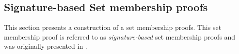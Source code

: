 





\subsection*{Signature-based  Set membership proofs}

This section presents a construction of a set membership proofs. This set membership proof is referred to as \textit{signature-based} set membership proofs and was originally presented in \cite{RANGE-SET}. 

